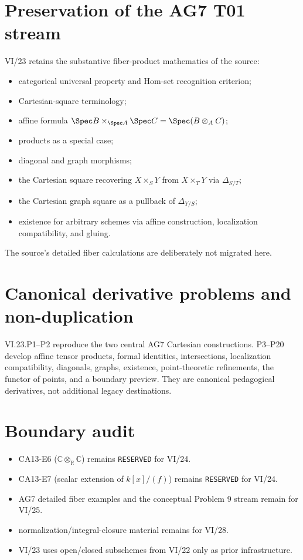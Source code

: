 \section*{Preservation of the AG7 T01 stream}
VI/23 retains the substantive fiber-product mathematics of the source:
\begin{itemize}
\item categorical universal property and Hom-set recognition criterion;
\item Cartesian-square terminology;
\item affine formula $\Spec B\times_{\Spec A}\Spec C=\Spec(B\otimes_AC)$;
\item products as a special case;
\item diagonal and graph morphisms;
\item the Cartesian square recovering $X\times_SY$ from $X\times_TY$ via $\Delta_{S/T}$;
\item the Cartesian graph square as a pullback of $\Delta_{Y/S}$;
\item existence for arbitrary schemes via affine construction, localization compatibility, and gluing.
\end{itemize}
The source's detailed fiber calculations are deliberately not migrated here.

\section*{Canonical derivative problems and non-duplication}
VI.23.P1--P2 reproduce the two central AG7 Cartesian constructions.  P3--P20 develop affine tensor
products, formal identities, intersections, localization compatibility, diagonals, graphs, existence,
point-theoretic refinements, the functor of points, and a boundary preview.  They are canonical
pedagogical derivatives, not additional legacy destinations.

\section*{Boundary audit}
\begin{itemize}
\item CA13-E6 ($\mathbb C\otimes_{\mathbb R}\mathbb C$) remains \texttt{RESERVED} for VI/24.
\item CA13-E7 (scalar extension of $k[x]/(f)$) remains \texttt{RESERVED} for VI/24.
\item AG7 detailed fiber examples and the conceptual Problem 9 stream remain for VI/25.
\item normalization/integral-closure material remains for VI/28.
\item VI/23 uses open/closed subschemes from VI/22 only as prior infrastructure.
\end{itemize}

